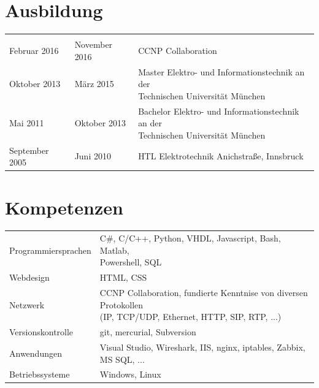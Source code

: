 	\section*{Ausbildung}
	\begin{tabularx}{\textwidth}{b{4cm}|b{3cm}|l}
		\thead{von} & \thead{bis} & \\
		Februar 2016 & November 2016 & CCNP Collaboration \\
		Oktober 2013 & März 2015 & \makecell[cl]{Master Elektro- und Informationstechnik an der \\ Technischen Universität München} \\
		Mai 2011 & Oktober 2013 & \makecell[cl]{Bachelor Elektro- und Informationstechnik an der \\ Technischen Universität München} \\
		September 2005 & Juni 2010 & HTL Elektrotechnik Anichstraße, Innsbruck
	\end{tabularx}
	
	\section*{Kompetenzen}
	\begin{tabularx}{\textwidth}{b{4cm}|l}
		Programmiersprachen & \makecell[cl]{C\#, C/C++, Python, VHDL, Javascript, Bash, Matlab, \\ Powershell, SQL} \\
		Webdesign & HTML, CSS \\
		Netzwerk & \makecell[cl]{CCNP Collaboration, fundierte Kenntnise von diversen Protokollen \\ (IP, TCP/UDP, Ethernet, HTTP, SIP, RTP, ...)} \\
		Versionskontrolle & git, mercurial, Subversion \\
		Anwendungen & Visual Studio, Wireshark, IIS, nginx, iptables, Zabbix, MS SQL, ... \\
		Betriebssysteme & Windows, Linux
	\end{tabularx}
